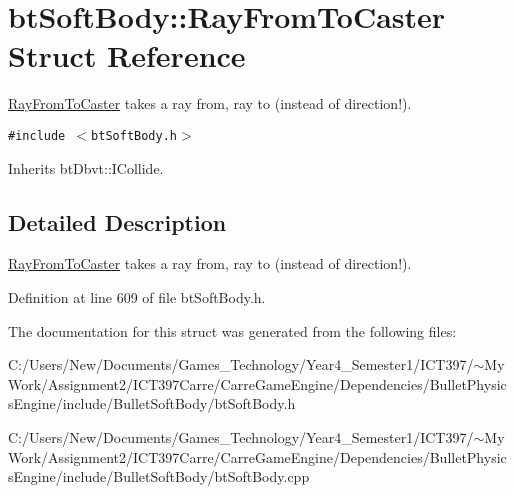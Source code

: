\hypertarget{structbt_soft_body_1_1_ray_from_to_caster}{
\section{btSoftBody::RayFromToCaster Struct Reference}
\label{structbt_soft_body_1_1_ray_from_to_caster}
}
\hyperlink{structbt_soft_body_1_1_ray_from_to_caster}{RayFromToCaster} takes a ray from, ray to (instead of direction!).  


{\tt \#include $<$btSoftBody.h$>$}

Inherits btDbvt::ICollide.



\subsection{Detailed Description}
\hyperlink{structbt_soft_body_1_1_ray_from_to_caster}{RayFromToCaster} takes a ray from, ray to (instead of direction!). 

Definition at line 609 of file btSoftBody.h.

The documentation for this struct was generated from the following files:\begin{CompactItemize}
\item 
C:/Users/New/Documents/Games\_\-Technology/Year4\_\-Semester1/ICT397/$\sim$My Work/Assignment2/ICT397Carre/CarreGameEngine/Dependencies/BulletPhysicsEngine/include/BulletSoftBody/btSoftBody.h\item 
C:/Users/New/Documents/Games\_\-Technology/Year4\_\-Semester1/ICT397/$\sim$My Work/Assignment2/ICT397Carre/CarreGameEngine/Dependencies/BulletPhysicsEngine/include/BulletSoftBody/btSoftBody.cpp\end{CompactItemize}
